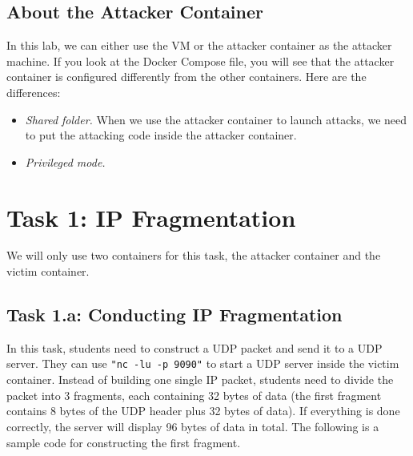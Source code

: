 \subsection{About the Attacker Container}

In this lab, we can either use the VM or the attacker container
as the attacker machine. If you look at the Docker Compose file, you will
see that the attacker container is configured differently from the other
containers. Here are the differences:

\begin{itemize}
\item \textit{Shared folder.} When we use the attacker container
to launch attacks, we need to put the attacking code inside
the attacker container.


\item \textit{Privileged mode.}


\end{itemize}



\section{Task 1: IP Fragmentation}

We will only use two containers for this task, the attacker container
and the victim container.

\subsection{Task 1.a: Conducting IP Fragmentation}

In this task, students need to construct a UDP packet and send it to a UDP 
server. They can use \texttt{"nc -lu -p 9090"} to start a UDP server inside
the victim container. 
Instead of building one single IP packet, students need to 
divide the packet into 3 fragments, each containing 32 bytes of data (the
first fragment contains 8 bytes of the UDP header plus 32 bytes of data).
If everything is done correctly, the server will display
96 bytes of data in total.  
The following is a sample code for constructing the first fragment.


